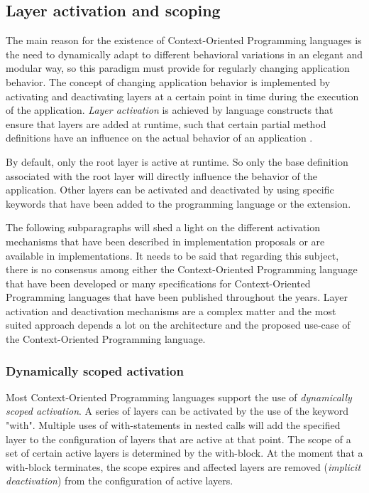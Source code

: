 \documentclass{acm_proc_article-sp}
\begin{document}
\subsection{Layer activation and scoping}
\label{sec:layer_activation_scoping}
The main reason for the existence of Context-Oriented Programming languages is the need to dynamically adapt to different behavioral variations in an elegant and modular way, so this paradigm must provide for regularly changing application behavior. The concept of changing  application behavior is implemented by activating and deactivating layers at a certain point in time during the execution of the application. \textit{Layer activation} is achieved by language constructs that ensure that layers are added at runtime, such that certain partial method definitions have an influence on the actual behavior of an application \cite{Kamina:2014:CSE:2577080.2579816}. 

By default, only the root layer is active at runtime. So only the base definition associated with the root layer will directly influence the behavior of the application. Other layers can be activated and deactivated by using specific keywords that have been added to the programming language or the extension. 

The following subparagraphs will shed a light on the different activation mechanisms that have been described in implementation proposals or are available in implementations. It needs to be said that regarding this subject, there is no consensus among either the Context-Oriented Programming language that have been developed or many specifications for Context-Oriented Programming languages that have been published throughout the years. Layer activation and deactivation mechanisms are a complex matter and the most suited approach depends a lot on the architecture and the proposed use-case of the Context-Oriented Programming language.

\subsubsection{Dynamically scoped activation}
\label{dynamically_scoped_activation}
Most Context-Oriented Programming languages support the use of \textit{dynamically scoped activation}. A series of layers can be activated by the use of the keyword "with". Multiple uses of with-statements in nested calls will add the specified layer to the configuration of layers that are active at that point. The scope of a set of certain active layers is determined by the with-block. At the moment that a with-block terminates, the scope expires and affected layers are removed (\textit{implicit deactivation}) from the configuration of active layers. 
\end{document}
